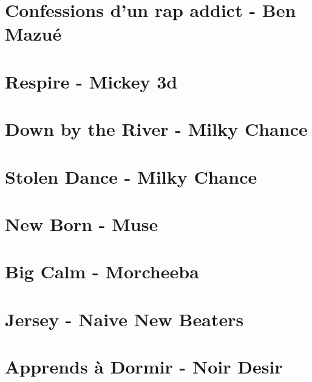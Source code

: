 \documentclass[11pt]{article}
\begin{document}
\section{Confessions d'un rap addict - Ben Mazué}
\begin{guitar}

\end{guitar}

\section{Respire - Mickey 3d}




\section{Down by the River - Milky Chance}


\section{Stolen Dance - Milky Chance}
\begin{guitar}

\end{guitar}





\section{New Born - Muse}




\section{Big Calm - Morcheeba}


\section{Jersey - Naive New Beaters}
\begin{guitar}

\end{guitar}



\section{Apprends à Dormir - Noir Desir}
\begin{guitar}

\end{guitar}
\end{document}
